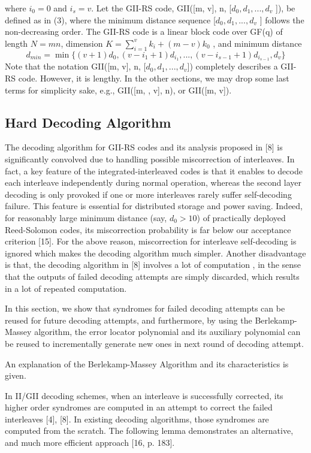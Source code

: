 \documentclass[fontsize=12pt]{article}
\begin{document}
where $i_0 = 0$ and $i_s = v$. Let the GII-RS code, GII([m, v],
n, [$d_0, d_1, . . . , d_v$ ]), be defined as in (3), where the minimum
distance sequence [$d_0, d_1, . . . , d_v$ ] follows the non-decreasing
order. The GII-RS code is a linear block code over GF(q) of
length $N = mn$, dimension $K =
\sum^{
v}_{i=1} k_i + (m − v)k_0$  , and
minimum distance
\begin{equation}
d_{min} = \min
\Big\{
(v + 1)d_0, (v - i_1 + 1)d_{i_1} ,
. . . , (v - i_{s-1} + 1)d_{i_{s-1}} , d_v
\Big \}
\end{equation}
Note that the notation GII([m, v], n, [$d_0, d_1, . . . , d_v $]) completely
describes a GII-RS code. However, it is lengthy. In the
other sections, we may drop some last terms for simplicity sake, e.g., GII([m, , v], n), or GII([m, v]).

\subsection{Hard Decoding Algorithm}
The decoding algorithm for GII-RS codes and its analysis
proposed in [8] is significantly convolved due to handling
possible miscorrection of interleaves. In fact, a key feature
of the integrated-interleaved codes is that it enables to
decode each interleave independently during normal operation,
whereas the second layer decoding is only provoked if one
or more interleaves rarely suffer self-decoding failure. This
feature is essential for distributed storage and power saving.
Indeed, for reasonably large minimum distance (say, $d_0 > 10$)
of practically deployed Reed-Solomon codes, its miscorrection
probability is far below our acceptance criterion [15].
For the above reason, miscorrection for interleave
self-decoding is ignored which makes the decoding
algorithm much simpler.
Another disadvantage is that, the decoding algorithm in [8] involves a lot of computation
, in the sense that the outputs of failed decoding
attempts are simply discarded, which results in a lot of
repeated computation.

In this section, we show that syndromes
for failed decoding attempts can be reused for future decoding
attempts, and furthermore, by using the Berlekamp-Massey
algorithm, the error locator polynomial and its auxiliary
polynomial can be reused to incrementally generate new
ones in next round of decoding attempt.

An explanation of the Berlekamp-Massey Algorithm and its characteristics is given.

In II/GII decoding schemes, when an interleave is successfully
corrected, its higher order syndromes are computed in
an attempt to correct the failed interleaves [4], [8]. In existing
decoding algorithms, those syndromes are computed from the
scratch. The following lemma demonstrates an alternative, and
much more efficient approach [16, p. 183].
\end{document}
